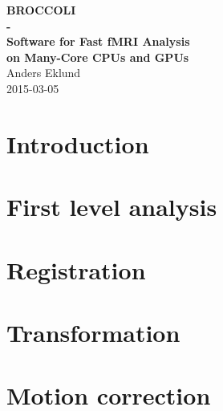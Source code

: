 \documentclass[11pt,a4paper,swedish]{book}
\makeatletter
\def\cleardoublepage{\clearpage\if@twoside \ifodd\c@page\else
\hbox{}
\thispagestyle{empty}     
\newpage 
\if@twocolumn\hbox{}\newpage\fi\fi\fi}
\makeatother
\begin{document}



\thispagestyle{empty}
\makeatletter
\begin{center}
  {\huge \textbf{BROCCOLI \\ - \\ Software for Fast fMRI Analysis \\ on Many-Core CPUs and GPUs}}\\[1 cm]
  {\Large Anders Eklund}\\[1.5 cm]
  {\Large 2015-03-05}\\[1.5 cm]
\end{center}


\renewcommand{\contentsname}{Table of Contents}
\tableofcontents



%


\chapter{Introduction}
\label{sec:intro}


\cleardoublepage
\newpage
\chapter{First level analysis}
\label{sec:firstlevel}


\cleardoublepage
\newpage
\chapter{Registration}
\label{sec:registration}


\cleardoublepage
\newpage
\chapter{Transformation}
\label{sec:transformation}


\cleardoublepage
\newpage
\chapter{Motion correction}
\label{sec:motion}

\end{document}
